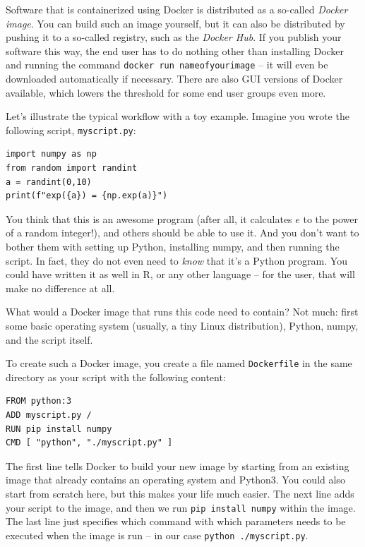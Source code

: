 Software that is containerized using Docker is distributed as a
so-called \emph{Docker image}. You can build such an image yourself,
but it can also be distributed by pushing it to a so-called registry,
such as the \emph{Docker Hub}. If you publish your software this
way, the end user has to do nothing other than installing Docker and
running the command \verb|docker run nameofyourimage| -- it will even be
downloaded automatically if necessary. There are also GUI versions
of Docker available, which lowers the threshold for some end user
groups even more.

Let's illustrate the typical workflow with a toy example. Imagine
you wrote the following script, \verb|myscript.py|:

\begin{verbatim}
import numpy as np
from random import randint
a = randint(0,10)
print(f"exp({a}) = {np.exp(a)}")
\end{verbatim}

You think that this is an awesome program (after all, it calculates
$e$ to the power of a random integer!), and others should be able
to use it. And you don't want to bother them with setting up Python,
installing numpy, and then running the script. In fact, they do
not even need to \emph{know} that it's a Python program. You
could have written it as well in R, or any other language -- for
the user, that will make no difference at all.

What would a Docker image that runs this code need to contain? Not
much: first some basic operating system (usually, a tiny Linux distribution),
Python, numpy, and the script itself.

To create such a Docker image, you create a file named \verb|Dockerfile|
in the same directory as your script with the following content:

\begin{verbatim}
FROM python:3
ADD myscript.py /
RUN pip install numpy
CMD [ "python", "./myscript.py" ]
\end{verbatim}


The first line tells Docker to build your new image by starting
from an existing image that already contains an operating system
and Python3. You could also start from scratch here, but this
makes your life much easier. The next line adds your script to the
image, and then we run \verb|pip install numpy| within the image.
The last line just specifies which command with which parameters
needs to be executed when the image is run -- in our case
\verb|python ./myscript.py|.

